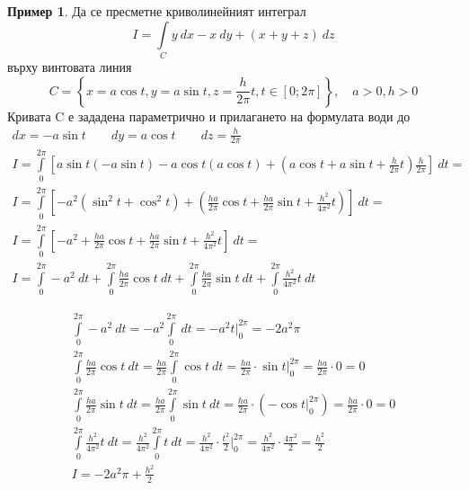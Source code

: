 \documentclass[a4paper,fleqn,12pt]{article}
\theoremstyle{definition}
\newtheorem{example}{Пример}[subsection]
\begin{document}
\begin{example}
Да се пресметне криволинейният интеграл
$$I = \int\limits_{C} y \ dx - x \ dy + (x+y+z) \ dz$$
върху винтовата линия
$$C = \left \{ x = a \cos t , y = a \sin t, z= \frac{h}{2\pi}t, t\in [0;2\pi] \right\}, \quad a>0, h>0$$
Кривата C е зададена параметрично и прилагането на формулата води до 
\begin{gather*}
dx = -a \sin t \qquad dy = a \cos t  \qquad dz = \frac{h}{2\pi} \\
I = \int\limits_0 ^{2\pi} \left[a\sin t (- a\sin t) - a\cos t (a \cos t) + \left(a \cos t + a\sin t + \frac{h}{2\pi}t \right) \frac{h}{2\pi}\right] \ dt = \\
I = \int\limits_0 ^{2\pi} \left[-a^2( \sin^2 t  + \cos^2 t)  + \left( \frac{ha}{2\pi}\cos t + \frac{ha}{2\pi}\sin t + \frac{h^2}{4\pi^2}t \right) \right] \ dt = \\
I = \int\limits_0 ^{2\pi} \left[-a^2 + \frac{ha}{2\pi}\cos t + \frac{ha}{2\pi}\sin t + \frac{h^2}{4\pi^2}t \right] \ dt = \\
I = \int\limits_0 ^{2\pi} -a^2 \ dt +
\int\limits_0 ^{2\pi} \frac{ha}{2\pi}\cos t \ dt + 
\int\limits_0 ^{2\pi} \frac{ha}{2\pi}\sin t \ dt +
\int\limits_0 ^{2\pi} \frac{h^2}{4\pi^2}t \ dt 
\end{gather*}

\begin{gather*}
\int\limits_0 ^{2\pi} -a^2 \ dt = -a^2 \int\limits_0 ^{2\pi} \ dt = -a^2 t \Big|_0 ^{2\pi} = -2a^2\pi \\
\int\limits_0 ^{2\pi} \frac{ha}{2\pi}\cos t \ dt =
\frac{ha}{2\pi} \int\limits_0 ^{2\pi} \cos t \ dt  = 
\frac{ha}{2\pi} \cdot \sin t \Big|_0 ^{2\pi} = \frac{ha}{2\pi} \cdot 0 = 0\\
\int\limits_0 ^{2\pi} \frac{ha}{2\pi}\sin t \ dt = 
\frac{ha}{2\pi} \int\limits_0 ^{2\pi}\sin t \ dt = 
\frac{ha}{2\pi} \cdot ( -\cos t \Big|_0 ^{2\pi} ) = \frac{ha}{2\pi} \cdot 0 = 0\\
\int\limits_0 ^{2\pi} \frac{h^2}{4\pi^2}t \ dt = 
\frac{h^2}{4\pi^2} \int\limits_0 ^{2\pi} t \ dt = 
\frac{h^2}{4\pi^2} \cdot \frac{t^2}{2} \Big|_0 ^{2\pi} = \frac{h^2}{4\pi^2} \cdot \frac{4\pi^2}{2} = \frac{h^2}{2}\\
I = -2a^2\pi +\frac{h^2}{2} 
\end{gather*}
\end{example}
\end{document}
